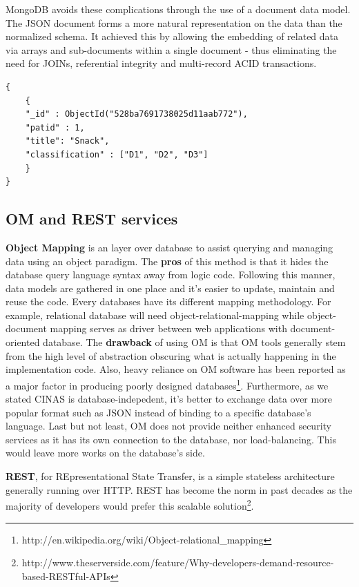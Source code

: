 \documentclass{article}
\begin{document}
MongoDB avoids these complications through the use of a document data model. The JSON document forms a more natural representation on the data than the normalized schema. It achieved this by allowing the embedding of related data via arrays and sub-documents within a single document - thus eliminating the need for JOINs, referential integrity and multi-record ACID transactions.

\begin{lstlisting}[caption=Json Example]
{
	{
	"_id" : ObjectId("528ba7691738025d11aab772"),
	"patid" : 1,
	"title": "Snack",
	"classification" : ["D1", "D2", "D3"]
	}
}
\end{lstlisting}

\subsection{OM and REST services}

\textbf{Object Mapping} is an layer over database to assist querying and managing data using an object paradigm. The \textbf{pros} of this method is that it hides the database query language syntax away from logic code. Following this manner, data models are gathered in one place and it's easier to update, maintain and reuse the code. Every databases have its different mapping methodology. For example, relational database will need object-relational-mapping while object-document mapping serves as driver between web applications with document-oriented database. The \textbf{drawback} of using OM is that OM tools generally stem from the high level of abstraction obscuring what is actually happening in the implementation code. Also, heavy reliance on OM software has been reported as a major factor in producing poorly designed databases\footnote{http://en.wikipedia.org/wiki/Object-relational\_mapping}. Furthermore, as we stated CINAS is database-indepedent, it's better to exchange data over more popular format such as JSON instead of binding to a specific database's language. Last but not least, OM does not provide neither enhanced security services as it has its own connection to the database, nor load-balancing. This would leave more works on the database's side.

\textbf{REST}, for REpresentational State Transfer, is a simple stateless architecture generally running over HTTP. REST has become the norm in past decades as the majority of developers would prefer this scalable solution\footnote{http://www.theserverside.com/feature/Why-developers-demand-resource-based-RESTful-APIs}.
\end{document}
